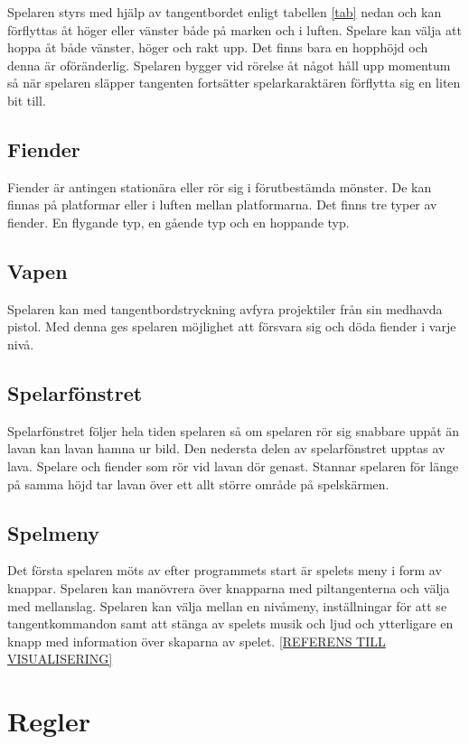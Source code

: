 \documentclass{TDP005mall}
\begin{document}
Spelaren styrs med hjälp av tangentbordet enligt tabellen \ref{tab} nedan och kan förflyttas åt höger eller vänster både på marken och i luften. Spelare kan välja att hoppa åt både vänster, höger och rakt upp. Det finns bara en hopphöjd och denna är oföränderlig. Spelaren bygger vid rörelse åt något håll upp momentum så när spelaren släpper tangenten fortsätter spelarkaraktären förflytta sig en liten bit till.

\subsection{Fiender}
Fiender är antingen stationära eller rör sig i förutbestämda mönster. De kan finnas på platformar eller i luften mellan platformarna. Det finns tre typer av fiender. En flygande typ, en gående typ och en hoppande typ.

\subsection{Vapen}
Spelaren kan med tangentbordstryckning avfyra projektiler från sin medhavda pistol. Med denna ges spelaren möjlighet att försvara sig och döda fiender i varje nivå. 

\subsection{Spelarfönstret}
Spelarfönstret följer hela tiden spelaren så om spelaren rör sig snabbare uppåt än lavan kan lavan hamna ur bild. Den nedersta delen av spelarfönstret upptas av lava. Spelare och fiender som rör vid lavan dör genast. Stannar spelaren för länge på samma höjd tar lavan över ett allt större område på spelskärmen. 


\subsection{Spelmeny}
Det första spelaren möts av efter programmets start är spelets meny i form av knappar. Spelaren kan manövrera över knapparna med piltangenterna och välja med mellanslag. Spelaren kan välja mellan en nivåmeny, inställningar för att se tangentkommandon samt att stänga av spelets musik och ljud och ytterligare en knapp med information över skaparna av spelet.  \ref{REFERENS TILL VISUALISERING} 

\section{Regler}%
\end{document}
